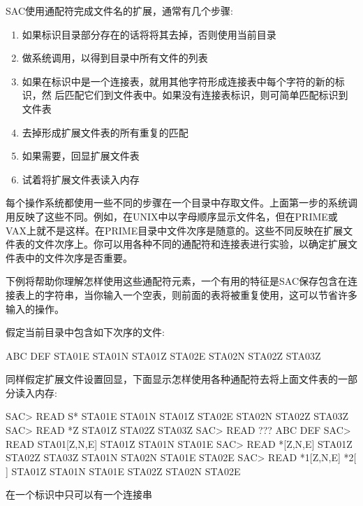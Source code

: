 SAC使用通配符完成文件名的扩展，通常有几个步骤:
\begin{enumerate}
\item 如果标识目录部分存在的话将将其去掉，否则使用当前目录
\item 做系统调用，以得到目录中所有文件的列表
\item 如果在标识中是一个连接表，就用其他字符形成连接表中每个字符的新的标识，然	  后匹配它们到文件表中。如果没有连接表标识，则可简单匹配标识到文件表
\item 去掉形成扩展文件表的所有重复的匹配
\item 如果需要，回显扩展文件表
\item 试着将扩展文件表读入内存
\end{enumerate}

每个操作系统都使用一些不同的步骤在一个目录中存取文件。上面第一步的系统调用反映了这些不同。例如，在UNIX中以字母顺序显示文件名，但在PRIME或VAX上就不是这样。在PRIME目录中文件次序是随意的。这些不同反映在扩展文件表的文件次序上。你可以用各种不同的通配符和连接表进行实验，以确定扩展文件表中的文件次序是否重要。

下例将帮助你理解怎样使用这些通配符元素，一个有用的特征是SAC保存包含在连接表上的字符串，当你输入一个空表，则前面的表将被重复使用，这可以节省许多输入的操作。

假定当前目录中包含如下次序的文件:
\begin{SACCode}
ABC DEF STA01E STA01N STA01Z STA02E STA02N STA02Z STA03Z
\end{SACCode}

同样假定扩展文件设置回显，下面显示怎样使用各种通配符去将上面文件表的一部分读入内存:
\begin{SACCode}
SAC> READ S*
 STA01E STA01N STA01Z STA02E STA02N STA02Z STA03Z
SAC> READ *Z
 STA01Z STA02Z STA03Z
SAC> READ ???
 ABC DEF
SAC> READ STA01[Z,N,E]
 STA01Z STA01N STA01E
SAC> READ *[Z,N,E]
 STA01Z STA02Z STA03Z STA01N STA02N STA01E STA02E
SAC> READ *1[Z,N,E] *2[ ]
 STA01Z STA01N STA01E STA02Z STA02N STA02E
\end{SACCode}

在一个标识中只可以有一个连接串
